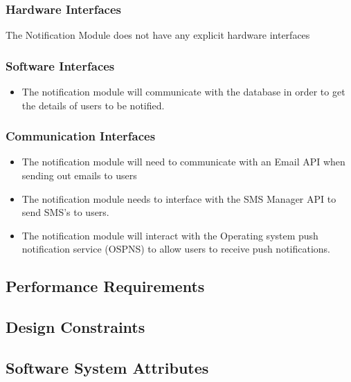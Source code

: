 \subsubsection{Hardware Interfaces}
The Notification Module does not have any explicit hardware interfaces

\subsubsection{Software Interfaces}
  \begin{itemize}
  	\item The notification module will communicate with the database in order to get the details of users to be notified.
  \end{itemize}
  
\subsubsection{Communication Interfaces}
	\begin{itemize}
		\item The notification module will need to communicate with an Email API when sending out emails to users
		\item The notification module needs to interface with the SMS Manager API to send SMS's to users.
		\item The notification module will interact with the Operating system push notification service (OSPNS) to allow users to receive push notifications.
	\end{itemize}
	
\subsection{Performance Requirements}
\subsection{Design Constraints}
\subsection{Software System Attributes}